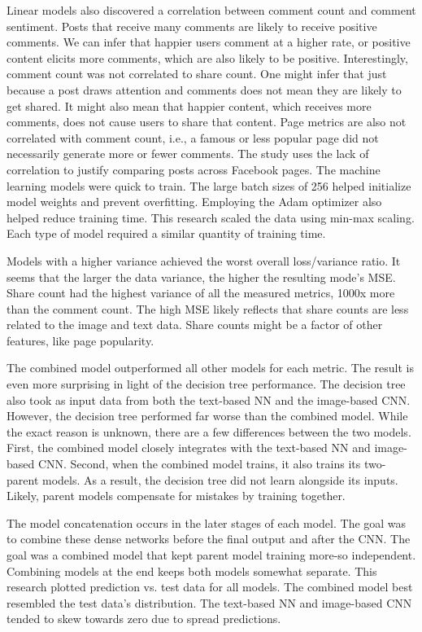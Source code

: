 \documentclass{article}
\begin{document}
Linear models also discovered a correlation between comment count and comment sentiment. Posts that receive many comments are likely to receive positive comments. We can infer that happier users comment at a higher rate, or positive content elicits more comments, which are also likely to be positive. Interestingly, comment count was not correlated to share count. One might infer that just because a post draws attention and comments does not mean they are likely to get shared. It might also mean that happier content, which receives more comments, does not cause users to share that content. Page metrics are also not correlated with comment count, i.e., a famous or less popular page did not necessarily generate more or fewer comments. The study uses the lack of correlation to justify comparing posts across Facebook pages.
The machine learning models were quick to train. The large batch sizes of 256 helped initialize model weights and prevent overfitting. Employing the Adam optimizer also helped reduce training time. This research scaled the data using min-max scaling. Each type of model required a similar quantity of training time. 

Models with a higher variance achieved the worst overall loss/variance ratio.  It seems that the larger the data variance, the higher the resulting mode's MSE.  Share count had the highest variance of all the measured metrics, 1000x more than the comment count.  The high MSE likely reflects that share counts are less related to the image and text data. Share counts might be a factor of other features, like page popularity.


The combined model outperformed all other models for each metric. The result is even more surprising in light of the decision tree performance. The decision tree also took as input data from both the text-based NN and the image-based CNN. However, the decision tree performed far worse than the combined model. While the exact reason is unknown, there are a few differences between the two models. First, the combined model closely integrates with the text-based NN and image-based CNN. Second, when the combined model trains, it also trains its two-parent models. As a result, the decision tree did not learn alongside its inputs. Likely, parent models compensate for mistakes by training together.

The model concatenation occurs in the later stages of each model. The goal was to combine these dense networks before the final output and after the CNN. The goal was a combined model that kept parent model training more-so independent. Combining models at the end keeps both models somewhat separate. This research plotted prediction vs. test data for all models. The combined model best resembled the test data's distribution. The text-based NN and image-based CNN tended to skew towards zero due to spread predictions.
\end{document}

